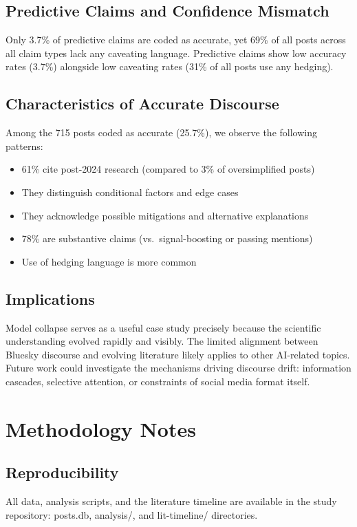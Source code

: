 \documentclass[11pt,preprint]{article}
\begin{document}
\subsection{Predictive Claims and Confidence Mismatch}
Only 3.7\% of predictive claims are coded as accurate, yet 69\% of all posts across all claim types lack any caveating language. Predictive claims show low accuracy rates (3.7\%) alongside low caveating rates (31\% of all posts use any hedging).

\subsection{Characteristics of Accurate Discourse}
Among the 715 posts coded as accurate (25.7\%), we observe the following patterns:
\begin{itemize}
  \item 61\% cite post-2024 research (compared to 3\% of oversimplified posts)
  \item They distinguish conditional factors and edge cases
  \item They acknowledge possible mitigations and alternative explanations
  \item 78\% are substantive claims (vs.\ signal-boosting or passing mentions)
  \item Use of hedging language is more common
\end{itemize}

\subsection{Implications}
Model collapse serves as a useful case study precisely because the scientific understanding evolved rapidly and visibly. The limited alignment between Bluesky discourse and evolving literature likely applies to other AI-related topics. Future work could investigate the mechanisms driving discourse drift: information cascades, selective attention, or constraints of social media format itself.

\section{Methodology Notes}
\label{sec:methodology}

\subsection{Reproducibility}
All data, analysis scripts, and the literature timeline are available in the study repository: posts.db, analysis/, and lit-timeline/ directories.
\end{document}
